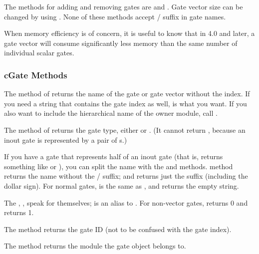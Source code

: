 The  methods for adding and removing gates are
 and .
Gate vector size can be changed by using .
None of these methods accept  /  suffix in gate names.

\begin{note}
    When memory efficiency is of concern, it is useful to know that
    in {\opp} 4.0 and later, a gate vector will consume significantly less
    memory than the same number of individual scalar gates.
\end{note}


\subsubsection{cGate Methods}
\label{sec:simple-modules:cgate-methods}

The  method of  returns the name of the
gate or gate vector without the index. If you need a string that contains the gate index
as well,  is what you want. If you also want to
include the hierarchical name of the owner module, call .

The  method of  returns the gate type,
either  or . (It cannot return
, because an inout gate is represented by a pair
of s.)

If you have a gate that represents half of an inout gate (that is,
 returns something like  or ), you
can split the name with the  and
 methods.  method returns the
name without the / suffix; and 
returns just the suffix (including the dollar sign). For normal gates,
 is the same as , and
 returns the empty string.

The , ,  speak
for themselves;  is an alias to . For
non-vector gates,  returns 0 and 
returns 1.

The  method returns the gate ID (not to be confused
with the gate index).

The  method returns the module the gate object
belongs to.

